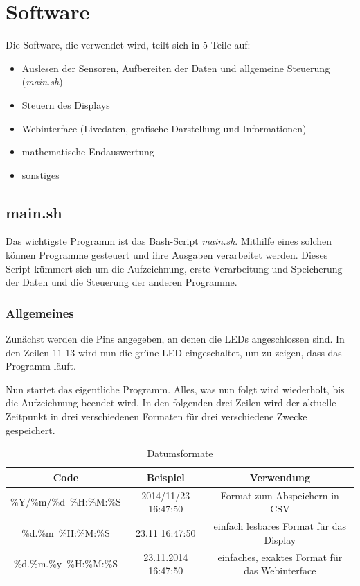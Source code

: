 \chapter{Software}
Die Software, die verwendet wird, teilt sich in 5 Teile auf:
\begin{itemize}
\item Auslesen der Sensoren, Aufbereiten der Daten und allgemeine Steuerung (\emph{main.sh})
\item Steuern des Displays
\item Webinterface (Livedaten, grafische Darstellung und Informationen)
\item mathematische Endauswertung
\item sonstiges
\end{itemize}

\section{main.sh}
\label{sec:main.sh}

Das wichtigste Programm ist das \gls{Bash}-Script \textit{main.sh}. Mithilfe eines solchen können Programme gesteuert und ihre Ausgaben verarbeitet werden. Dieses Script kümmert sich um die Aufzeichnung, erste Verarbeitung und Speicherung der Daten und die Steuerung der anderen Programme. 

\subsection{Allgemeines}
\label{subsec:main.sh/allgemeines}

Zunächst werden die Pins angegeben, an denen die \gls{LED}s angeschlossen sind. In den Zeilen 11-13 wird nun die grüne \gls{LED} eingeschaltet, um zu zeigen, dass das Programm läuft.

Nun startet das eigentliche Programm. Alles, was nun folgt wird wiederholt, bis die Aufzeichnung beendet wird.
In den folgenden drei Zeilen wird der aktuelle Zeitpunkt in drei verschiedenen Formaten für drei verschiedene Zwecke gespeichert.
\begin{table}[h]
	\centering
	\begin{tabulary}{\textwidth}{C|C|C}
		Code & Beispiel & Verwendung \\
		\hline
		\hline
		\%Y/\%m/\%d\ \%H:\%M:\%S & 2014/11/23 16:47:50 & Format zum Abspeichern in \gls{CSV} \\
		\hline
		\%d.\%m\ \%H:\%M:\%S & 23.11 16:47:50 & einfach lesbares Format für das Display \\
		\hline
		\%d.\%m.\%y\ \%H:\%M:\%S & 23.11.2014 16:47:50 & einfaches, exaktes Format für das Webinterface \\
	\end{tabulary}
	\caption{Datumsformate}
\end{table}

